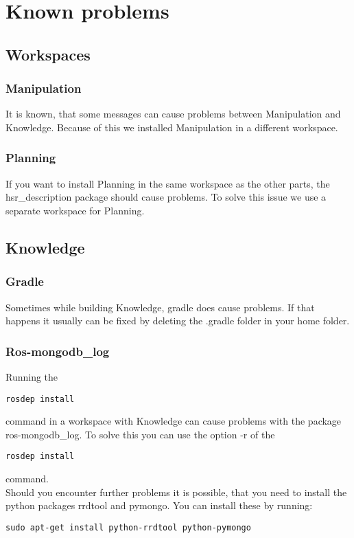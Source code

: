 \documentclass[main.tex]{subfiles}
\begin{document}
	\section{Known problems}

	\subsection{Workspaces}
	\subsubsection{Manipulation}
	It is known, that some messages can cause problems between Manipulation and Knowledge. Because of this we installed Manipulation in a different workspace.
	
	\subsubsection{Planning}
	If you want to install Planning in the same workspace as the other parts, the hsr\_description package should cause problems. To solve this issue we use a separate workspace for Planning.
	

	\subsection{Knowledge}
	\subsubsection{Gradle}
	Sometimes while building Knowledge, gradle does cause problems.
	If that happens it usually can be fixed by deleting the .gradle folder in your home folder.
	
	\subsubsection{Ros-mongodb\_log}
	Running the \\
	\begin{lstlisting}
rosdep install
\end{lstlisting}
command in a workspace with Knowledge can cause problems with the package ros-mongodb\_log. To solve this you can use the option -r of the \\
\begin{lstlisting}
rosdep install
\end{lstlisting}
command.\\
Should you encounter further problems it is possible, that you need to install the  python packages rrdtool and pymongo. You can install these by running:\\
\begin{lstlisting}
sudo apt-get install python-rrdtool python-pymongo
\end{lstlisting}
\end{document}
